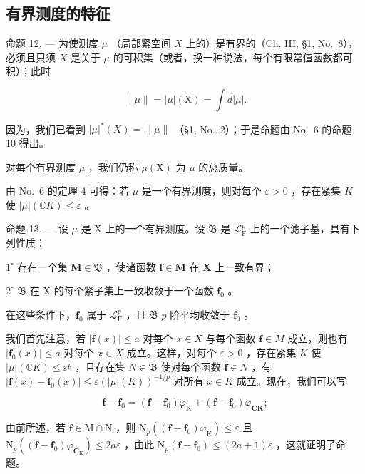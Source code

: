 \subsection{有界测度的特征}

命题 12. --- 为使测度 \(\mu\) （局部紧空间 \(X\) 上的）是有界的（Ch. III, §1, No.~8），必须且只须 \(X\) 是关于 \(\mu\) 的可积集（或者，换一种说法，每个有限常值函数都可积）；此时

\[
\| \mu \| = | \mu | (\mathrm{X}) = \int d | \mu |.
\]

因为，我们已看到 \(|\mu|^{*}(X) = \|\mu\|\) （§1, No.~2）；于是命题由 No.~6 的命题 10 得出。

对每个有界测度 \(\mu\) ，我们仍称 \(\mu(\mathrm{X})\) 为 \(\mu\) 的总质量。

由 No.~6 的定理 4 可得：若 \(\mu\) 是一个有界测度，则对每个 \(\varepsilon > 0\) ，存在紧集 \(K\) 使 \(|\mu| (\mathbb{C}K) \leqslant \varepsilon\) 。

命题 13. --- 设 \(\mu\) 是 X 上的一个有界测度。设 \(\mathfrak{B}\) 是 \(\mathcal{L}_{\mathrm{F}}^{p}\) 上的一个滤子基，具有下列性质：

\(1^{\circ}\) 存在一个集 \(\mathbf{M} \in \mathfrak{B}\) ，使诸函数 \(\mathbf{f} \in \mathbf{M}\) 在 \(\mathbf{X}\) 上一致有界；

\(2^{\circ}\) \(\mathfrak{B}\) 在 X 的每个紧子集上一致收敛于一个函数 \(\mathbf{f}_0\) 。

在这些条件下，\(\mathbf{f}_0\) 属于 \(\mathcal{L}_{\mathrm{F}}^{p}\) ，且 \(\mathfrak{B}\) \(p\) 阶平均收敛于 \(\mathbf{f}_0\) 。

我们首先注意，若 \(|\mathbf{f}(x)| \leqslant a\) 对每个 \(x \in X\) 与每个函数 \(\mathbf{f} \in M\) 成立，则也有 \(|\mathbf{f}_0(x)| \leqslant a\) 对每个 \(x \in X\) 成立。这样，对每个 \(\varepsilon > 0\) ，存在紧集 \(K\) 使 \(|\mu|(\mathbb{C}K) \leqslant \varepsilon^p\) ，且存在集 \(N \in \mathfrak{B}\) 使对每个函数 \(\mathbf{f} \in N\) ，有 \(|\mathbf{f}(x) - \mathbf{f}_0(x)| \leqslant \varepsilon(|\mu|(K))^{-1/p}\) 对所有 \(x \in K\) 成立。现在，我们可以写

\[
\mathbf {f} - \mathbf {f} _ {0} = (\mathbf {f} - \mathbf {f} _ {0}) \varphi_ {\mathrm{K}} + (\mathbf {f} - \mathbf {f} _ {0}) \varphi_ {\mathbf {C K}};
\]

由前所述，若 \(\mathbf{f} \in \mathrm{M} \cap \mathrm{N}\) ，则 \(\mathrm{N}_p((\mathbf{f} - \mathbf{f}_0)\varphi_{\mathrm{K}}) \leqslant \varepsilon\) 且 \(\mathrm{N}_p((\mathbf{f} - \mathbf{f}_0)\varphi_{\mathbf{C}_{\mathrm{K}}}) \leqslant 2a\varepsilon\) ，由此 \(\mathrm{N}_p(\mathbf{f} - \mathbf{f}_0) \leqslant (2a + 1)\varepsilon\) ，这就证明了命题。

